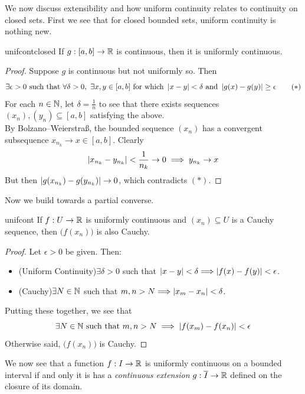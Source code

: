 We now discuss extensibility and how uniform continuity relates to continuity on closed sets. First we see that for closed bounded sets, uniform continuity is nothing new.

\begin{thm}{}{unifcontclosed}
	If $g:[a,b]\to\mathbb{R}$ is continuous, then it is uniformly continuous. 
\end{thm}

\begin{proof}
	Suppose $g$ is continuous but not uniformly so. Then
	\[
		\exists \epsilon>0\text{ such that }
		\forall\delta>0,\ \exists x,y\in [a,b]\text{ for which }
		\left| x-y\right|<\delta\text{ and }
		\left| g(x)-g(y)\right|\ge\epsilon \tag{$\ast$}
	\]
	For each $n\in\mathbb{N}$, let $\delta=\frac 1n$ to see that there exists sequences $(x_n),(y_n)\subseteq[a,b]$ satisfying the above.\\
	By Bolzano--Weierstraß, the bounded sequence $(x_n)$ has a convergent subsequence $x_{n_k}\to x\in[a,b]$. Clearly
	\[
		\left| x_{n_k}-y_{n_k}\right|<\frac 1{n_k}\to 0\implies y_{n_k}\to x
	\]
	But then $\left| g(x_{n_k})-g(y_{n_k})\right|\to 0$, which contradicts $(\ast)$.
\end{proof}

Now we build towards a partial converse.

\begin{lemm}{}{unifcont}
	If $f:U\to\mathbb{R}$ is uniformly continuous and $(x_n)\subseteq U$ is a Cauchy sequence, then $\bigl(f(x_n)\bigr)$ is also Cauchy.
\end{lemm}

\begin{proof}
	Let $\epsilon>0$ be given. Then:
	\begin{itemize}
	  \item (Uniform Continuity)\lstsp $\exists\delta>0$ such that $\left| x-y\right|<\delta\Longrightarrow \left| f(x)-f(y)\right|<\epsilon$.
	  \item (Cauchy)\lstsp $\exists N\in\mathbb{N}$ such that $m,n>N\Longrightarrow \left| x_m-x_n\right|<\delta$.
	\end{itemize}
	Putting these together, we see that
	\[
		\exists N\in\mathbb{N}\text{ such that }m,n>N
		\implies \left| f(x_m)-f(x_n)\right|<\epsilon
	\]
	Otherwise said, $\bigl(f(x_n)\bigr)$ is Cauchy.
\end{proof}
	
\goodbreak

We now see that a function $f:I\to \mathbb{R}$ is uniformly continuous on a bounded interval if and only it is has a \emph{continuous extension} $g:\overline{I}\to\mathbb{R}$ defined on the closure of its domain.

